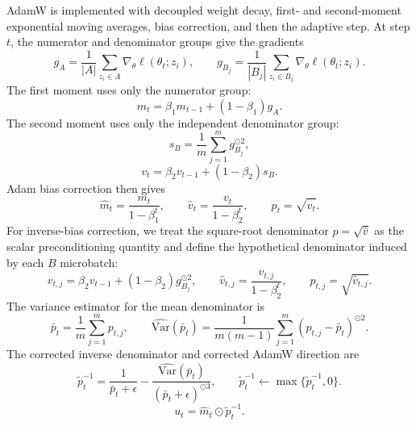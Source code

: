 \documentclass{article}
\newcommand{\Var}{\mathrm{Var}}
\begin{document}
AdamW is implemented with decoupled weight decay, first- and second-moment exponential moving averages, bias correction, and then the adaptive step. At step $t$, the numerator and denominator groups give the gradients
\begin{equation}
    g_A
    =
    \frac{1}{|A|}\sum_{z_i\in A}\nabla_\theta \ell(\theta_t;z_i),
    \qquad
    g_{B_j}
    =
    \frac{1}{|B_j|}\sum_{z_i\in B_j}\nabla_\theta \ell(\theta_t;z_i).
\end{equation}
The first moment uses only the numerator group:
\begin{equation}
    m_t
    =
    \beta_1 m_{t-1}+(1-\beta_1)g_A.
\end{equation}
The second moment uses only the independent denominator group:
\begin{equation}
    s_B
    =
    \frac{1}{m}\sum_{j=1}^m g_{B_j}^{\odot 2},
\end{equation}
\begin{equation}
    v_t
    =
    \beta_2 v_{t-1}+(1-\beta_2)s_B.
\end{equation}
Adam bias correction then gives
\begin{equation}
    \hat m_t=\frac{m_t}{1-\beta_1^t},
    \qquad
    \hat v_t=\frac{v_t}{1-\beta_2^t},
    \qquad
    p_t=\sqrt{\hat v_t}.
\end{equation}
For inverse-bias correction, we treat the square-root denominator $p=\sqrt{\hat v}$ as the scalar preconditioning quantity and define the hypothetical denominator induced by each $B$ microbatch:
\begin{equation}
    v_{t,j}
    =
    \beta_2 v_{t-1}+(1-\beta_2)g_{B_j}^{\odot 2},
    \qquad
    \hat v_{t,j}=\frac{v_{t,j}}{1-\beta_2^t},
    \qquad
    p_{t,j}=\sqrt{\hat v_{t,j}}.
\end{equation}
The variance estimator for the mean denominator is
\begin{equation}
    \bar p_t
    =
    \frac{1}{m}\sum_{j=1}^m p_{t,j},
    \qquad
    \widehat{\Var}(\bar p_t)
    =
    \frac{1}{m(m-1)}\sum_{j=1}^m (p_{t,j}-\bar p_t)^{\odot 2}.
\end{equation}
The corrected inverse denominator and corrected AdamW direction are
\begin{equation}
    \widetilde p_t^{-1}
    =
    \frac{1}{\bar p_t+\epsilon}
    -
    \frac{\widehat{\Var}(\bar p_t)}{(\bar p_t+\epsilon)^{\odot 3}},
    \qquad
    \widetilde p_t^{-1}\leftarrow \max\{\widetilde p_t^{-1},0\}.
\end{equation}
\begin{equation}
    u_t
    =
    \hat m_t\odot \widetilde p_t^{-1}.
\end{equation}
\end{document}
